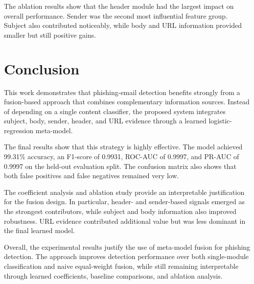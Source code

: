 The ablation results show that the header module had the largest impact on overall performance. Sender was the second most influential feature group. Subject also contributed noticeably, while body and URL information provided smaller but still positive gains.

\section{Conclusion}
This work demonstrates that phishing-email detection benefits strongly from a fusion-based approach that combines complementary information sources. Instead of depending on a single content classifier, the proposed system integrates subject, body, sender, header, and URL evidence through a learned logistic-regression meta-model.

The final results show that this strategy is highly effective. The model achieved 99.31\% accuracy, an F1-score of 0.9931, ROC-AUC of 0.9997, and PR-AUC of 0.9997 on the held-out evaluation split. The confusion matrix also shows that both false positives and false negatives remained very low.

The coefficient analysis and ablation study provide an interpretable justification for the fusion design. In particular, header- and sender-based signals emerged as the strongest contributors, while subject and body information also improved robustness. URL evidence contributed additional value but was less dominant in the final learned model.

Overall, the experimental results justify the use of meta-model fusion for phishing detection. The approach improves detection performance over both single-module classification and naive equal-weight fusion, while still remaining interpretable through learned coefficients, baseline comparisons, and ablation analysis.

